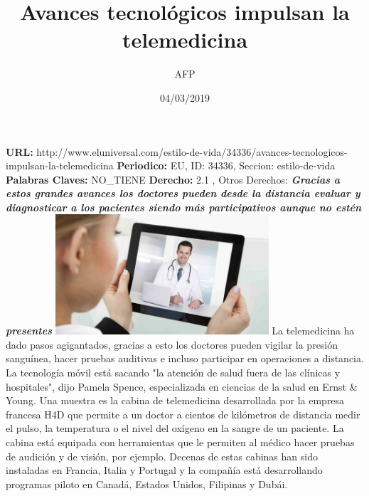 \documentclass{article}%
\title{\textbf{Avances tecnológicos impulsan la telemedicina}}%
\author{AFP}%
\date{04/03/2019}%
\begin{document}
%
\normalsize%
\maketitle%
\textbf{URL: }%
http://www.eluniversal.com/estilo{-}de{-}vida/34336/avances{-}tecnologicos{-}impulsan{-}la{-}telemedicina\newline%
%
\textbf{Periodico: }%
EU, %
ID: %
34336, %
Seccion: %
estilo{-}de{-}vida\newline%
%
\textbf{Palabras Claves: }%
NO\_TIENE\newline%
%
\textbf{Derecho: }%
2.1%
, Otros Derechos: %
\newline%
%
\textbf{\textit{Gracias a estos grandes avances los doctores pueden desde la distancia evaluar y diagnosticar a los pacientes siendo más participativos aunque no estén presentes}}%
\newline%
\newline%
%
\includegraphics[width=300px]{EU_34336.jpg}%
\newline%
%
La telemedicina ha dado pasos agigantados, gracias a esto los doctores pueden vigilar la presión sanguínea, hacer pruebas auditivas e incluso participar en operaciones a distancia.%
\newline%
%
La tecnología móvil está sacando "la atención de salud fuera de las clínicas y hospitales", dijo Pamela Spence, especializada en ciencias de la salud en Ernst \& Young. \newline%
\newline%
Una muestra es la cabina de telemedicina desarrollada por la empresa francesa H4D que permite a un doctor a cientos de kilómetros de distancia medir el pulso, la temperatura o el nivel del oxígeno en la sangre de un paciente.%
\newline%
%
La cabina está equipada con herramientas que le permiten al médico hacer pruebas de audición y de visión, por ejemplo. \newline%
\newline%
Decenas de estas cabinas han sido instaladas en Francia, Italia y Portugal y la compañía está desarrollando programas piloto en Canadá, Estados Unidos, Filipinas y Dubái.%
\end{document}
